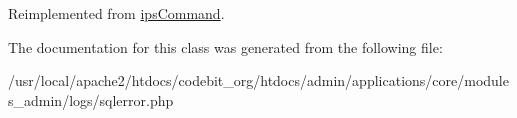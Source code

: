 Reimplemented from \hyperlink{classips_command_afbc4e912a0604b94d47d66744c64d8ba}{ips\-Command}.



The documentation for this class was generated from the following file\-:\begin{DoxyCompactItemize}
\item 
/usr/local/apache2/htdocs/codebit\-\_\-org/htdocs/admin/applications/core/modules\-\_\-admin/logs/sqlerror.\-php\end{DoxyCompactItemize}
